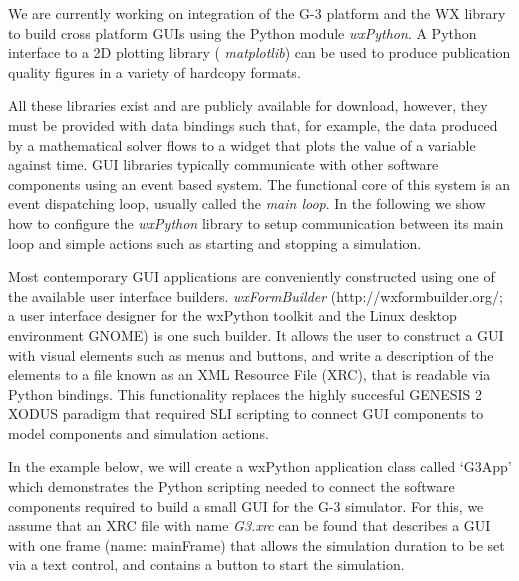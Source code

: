 \documentclass[12pt]{article}
\begin{document}
We are currently working on integration of the G-3 platform and the WX
library to build cross platform GUIs using the Python module {\it
  wxPython}. A Python interface to a 2D plotting library ({\it
  matplotlib}) can be used to produce publication quality figures in a
variety of hardcopy formats.

All these libraries exist and are publicly available for download,
however, they must be provided with data bindings such that, for
example, the data produced by a mathematical solver flows to a widget
that plots the value of a variable against time.
GUI libraries typically communicate with other software components
using an event based system.  The functional core of this system is an
event dispatching loop, usually called the {\it main loop}.  In the
following we show how to configure the {\it wxPython} library to setup
communication between its main loop and simple actions such as
starting and stopping a simulation.

Most contemporary GUI applications are conveniently constructed using
one of the available user interface builders.  {\it wxFormBuilder}
(http://wxformbuilder.org/; a user interface designer for the wxPython
toolkit and the Linux desktop environment GNOME) is one such builder.
It allows the user to construct a GUI with visual elements such as
menus and buttons, and write a description of the elements to a file
known as an XML Resource File (XRC), that is readable via Python
bindings.  This functionality replaces the highly succesful GENESIS 2
XODUS paradigm that required SLI scripting to connect GUI components
to model components and simulation actions.



In the example below, we will create a wxPython application class 
called `G3App' which demonstrates the Python scripting needed to 
connect the software components required to build a small GUI for 
the G-3 simulator.  For this, we assume that an XRC file with name
{\it G3.xrc} can be found that describes a GUI with one frame (name:
mainFrame) that allows the simulation duration to be set via a
text control, and contains a button to start the simulation.
\end{document}
